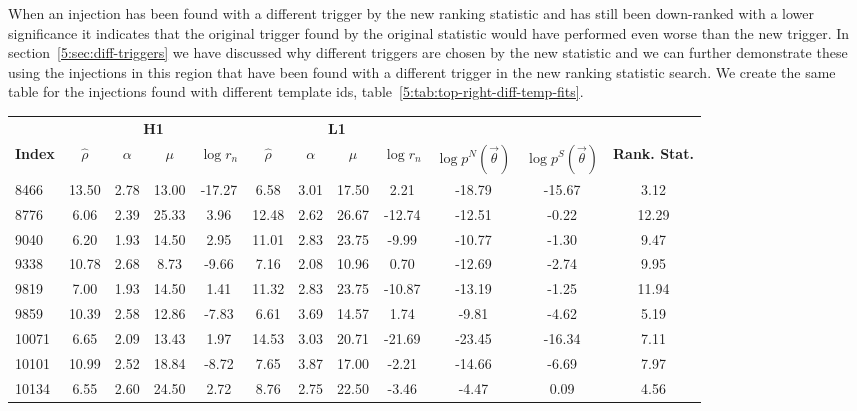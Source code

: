 When an injection has been found with a different trigger by the new ranking statistic and has still been down-ranked with a lower significance it indicates that the original trigger found by the original statistic would have performed even worse than the new trigger. In section~\ref{5:sec:diff-triggers} we have discussed why different triggers are chosen by the new statistic and we can further demonstrate these using the injections in this region that have been found with a different trigger in the new ranking statistic search. We create the same table for the injections found with different template ids, table~\ref{5:tab:top-right-diff-temp-fits}.
%
\begin{table}[ht]
    \centering
    \small
    \setlength{\tabcolsep}{4pt}
    \begin{tabular}{lccccccccccc}
        \toprule
        & \multicolumn{4}{c}{\textbf{H1}} & \multicolumn{4}{c}{\textbf{L1}} \\
        \cmidrule(lr){2-5} \cmidrule(lr){6-9}
        \textbf{Index} & \textbf{$\hat{\rho}$} & \textbf{$\alpha$} & \textbf{$\mu$} & \textbf{$\log r_n$} & \textbf{$\hat{\rho}$} & \textbf{$\alpha$} & \textbf{$\mu$} & \textbf{$\log r_n$} & \textbf{$\log p^{N}(\Vec{\theta})$} & \textbf{$\log p^{S}(\Vec{\theta})$} & \textbf{Rank. Stat.} \\
        \midrule
        8466 & 13.50 & 2.78 & 13.00 & -17.27 & 6.58 & 3.01 & 17.50 & 2.21 & -18.79 & -15.67 & 3.12 \\
        8776 & 6.06 & 2.39 & 25.33 & 3.96 & 12.48 & 2.62 & 26.67 & -12.74 & -12.51 & -0.22 & 12.29 \\
        9040 & 6.20 & 1.93 & 14.50 & 2.95 & 11.01 & 2.83 & 23.75 & -9.99 & -10.77 & -1.30 & 9.47 \\
        9338 & 10.78 & 2.68 & 8.73 & -9.66 & 7.16 & 2.08 & 10.96 & 0.70 & -12.69 & -2.74 & 9.95 \\
        9819 & 7.00 & 1.93 & 14.50 & 1.41 & 11.32 & 2.83 & 23.75 & -10.87 & -13.19 & -1.25 & 11.94 \\
        9859 & 10.39 & 2.58 & 12.86 & -7.83 & 6.61 & 3.69 & 14.57 & 1.74 & -9.81 & -4.62 & 5.19 \\
        10071 & 6.65 & 2.09 & 13.43 & 1.97 & 14.53 & 3.03 & 20.71 & -21.69 & -23.45 & -16.34 & 7.11 \\
        10101 & 10.99 & 2.52 & 18.84 & -8.72 & 7.65 & 3.87 & 17.00 & -2.21 & -14.66 & -6.69 & 7.97 \\
        10134 & 6.55 & 2.60 & 24.50 & 2.72 & 8.76 & 2.75 & 22.50 & -3.46 & -4.47 & 0.09 & 4.56 \\

\end{tabular}
\end{table}

